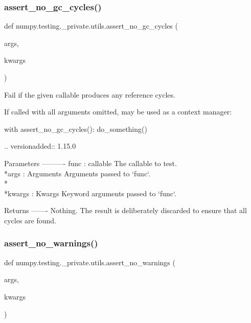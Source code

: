 \subsubsection{\texorpdfstring{assert\+\_\+no\+\_\+gc\+\_\+cycles()}{assert\_no\_gc\_cycles()}}
{\footnotesize\ttfamily def numpy.\+testing.\+\_\+private.\+utils.\+assert\+\_\+no\+\_\+gc\+\_\+cycles (\begin{DoxyParamCaption}\item[{}]{args,  }\item[{}]{kwargs }\end{DoxyParamCaption})}

\begin{DoxyVerb}Fail if the given callable produces any reference cycles.

If called with all arguments omitted, may be used as a context manager:

    with assert_no_gc_cycles():
        do_something()

.. versionadded:: 1.15.0

Parameters
----------
func : callable
    The callable to test.
\\*args : Arguments
    Arguments passed to `func`.
\\*\\*kwargs : Kwargs
    Keyword arguments passed to `func`.

Returns
-------
Nothing. The result is deliberately discarded to ensure that all cycles
are found.\end{DoxyVerb}
 \mbox{\label{namespacenumpy_1_1testing_1_1__private_1_1utils_a3f23e39a989fc996a88d58fa2ce03134}} 
\subsubsection{\texorpdfstring{assert\+\_\+no\+\_\+warnings()}{assert\_no\_warnings()}}
{\footnotesize\ttfamily def numpy.\+testing.\+\_\+private.\+utils.\+assert\+\_\+no\+\_\+warnings (\begin{DoxyParamCaption}\item[{}]{args,  }\item[{}]{kwargs }\end{DoxyParamCaption})}

